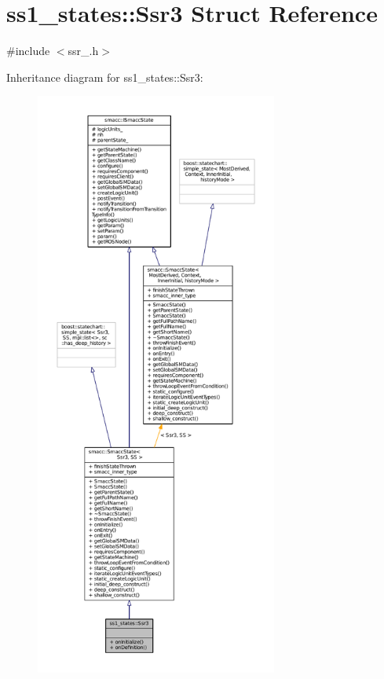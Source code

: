 \hypertarget{structss1__states_1_1Ssr3}{}\section{ss1\+\_\+states\+:\+:Ssr3 Struct Reference}
\label{structss1__states_1_1Ssr3}


{\ttfamily \#include $<$ssr\+\_.\+h$>$}



Inheritance diagram for ss1\+\_\+states\+:\+:Ssr3\+:
\nopagebreak
\begin{figure}[H]
\begin{center}
\leavevmode
\includegraphics[height=550pt]{structss1__states_1_1Ssr3__inherit__graph}
\end{center}
\end{figure}


